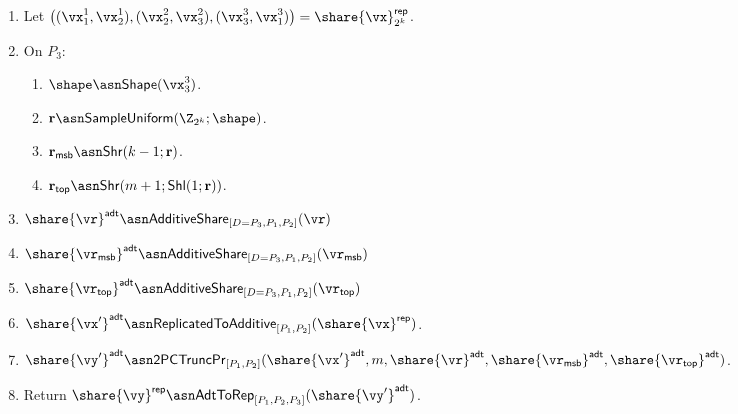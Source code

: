 \begin{enumerate}
  \item Let $\left( (\vx_1^1, \vx_2^1), (\vx_2^2, \vx_3^2), (\vx_3^3, \vx_1^3) \right) = \share{\vx}^{\mathsf{rep}}_{2^k}$.

  \item On $P_3$:
  \begin{enumerate}
    \item $\shape \asn \mathsf{Shape}(\vx^3_3)$.
    \item $\mathbf{r} \asn \mathsf{SampleUniform}(\Z_{2^k}; \shape)$.
    \item $\mathbf{r}_{\mathsf{msb}} \asn \mathsf{Shr}(k-1; \mathbf{r})$.
    \item $\mathbf{r}_{\mathsf{top}} \asn \mathsf{Shr}(m+1; \mathsf{Shl}(1; \mathbf{r}))$.
  \end{enumerate}

  \item $\share{\vr}^{\mathsf{adt}} \asn \mathsf{AdditiveShare}_{[D=P_3, P_1, P_2]}(\vr)$

  \item $\share{\vr_{\mathsf{msb}}}^{\mathsf{adt}} \asn \mathsf{AdditiveShare}_{[D=P_3, P_1, P_2]}(\vr_{\mathsf{msb}})$

  \item $\share{\vr_{\mathsf{top}}}^{\mathsf{adt}} \asn \mathsf{AdditiveShare}_{[D=P_3, P_1, P_2]}(\vr_{\mathsf{top}})$

  \item $\share{\vx'}^{\mathsf{adt}} \asn \mathsf{ReplicatedToAdditive}_{[P_1, P_2]}(\share{\vx}^{\mathsf{rep}})$.

  \item $\share{\vy'}^{\mathsf{adt}} \asn \mathsf{2PCTruncPr}_{[P_1, P_2]}(\share{\vx'}^{\mathsf{adt}}, m, \share{\vr}^{\mathsf{adt}}, \share{\vr_{\mathsf{msb}}}^{\mathsf{adt}}, \share{\vr_{\mathsf{top}}}^{\mathsf{adt}} )$.

  \item Return $\share{\vy}^{\mathsf{rep}} \asn \mathsf{AdtToRep}_{[P_1, P_2, P_3]}(\share{\vy'}^{\mathsf{adt}})$.

\end{enumerate}


